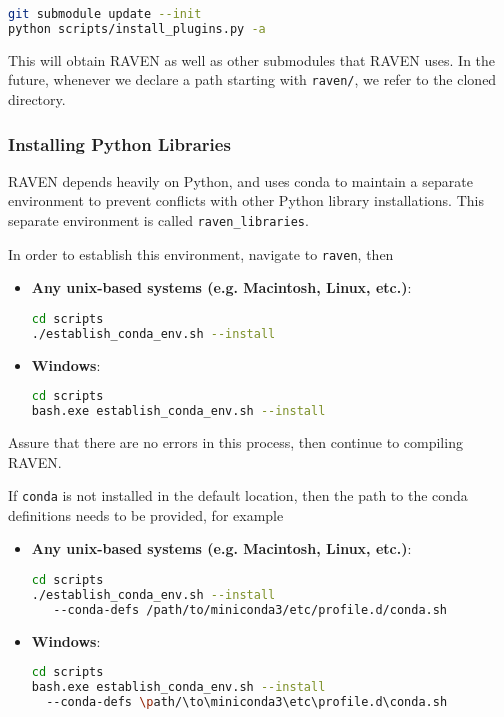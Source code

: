 \begin{lstlisting}[language=bash]
git submodule update --init
python scripts/install_plugins.py -a
\end{lstlisting}
This will obtain RAVEN as well as other submodules that RAVEN uses.  In the future, whenever we declare a path
starting with \texttt{raven/}, we refer to the cloned directory.




\subsubsection{Installing Python Libraries}
\label{subsec:installPythonLibs}
RAVEN depends heavily on Python, and uses conda to maintain a separate environment to prevent conflicts with
other Python library installations.  This separate environment is called \texttt{raven\_libraries}.

In order to establish this environment, navigate to \texttt{raven}, then
\begin{itemize}

  \item \textbf{Any unix-based systems (e.g. Macintosh, Linux, etc.)}:
\begin{lstlisting}[language=bash]
cd scripts
./establish_conda_env.sh --install
\end{lstlisting}
  \item \textbf{Windows}:
  \begin{lstlisting}[language=bash]
cd scripts
bash.exe establish_conda_env.sh --install
\end{lstlisting}

\end{itemize}
Assure that there are no errors in this process, then continue to compiling RAVEN.

\nb If \texttt{conda} is not installed in the default location, then the path to the conda definitions
needs to be provided, for example

\begin{itemize}

  \item \textbf{Any unix-based systems (e.g. Macintosh, Linux, etc.)}:
\begin{lstlisting}[language=bash]
cd scripts
./establish_conda_env.sh --install
   --conda-defs /path/to/miniconda3/etc/profile.d/conda.sh
\end{lstlisting}
  \item \textbf{Windows}:
  \begin{lstlisting}[language=bash]
cd scripts
bash.exe establish_conda_env.sh --install
  --conda-defs \path/\to\miniconda3\etc\profile.d\conda.sh
\end{lstlisting}
  
\end{itemize}

